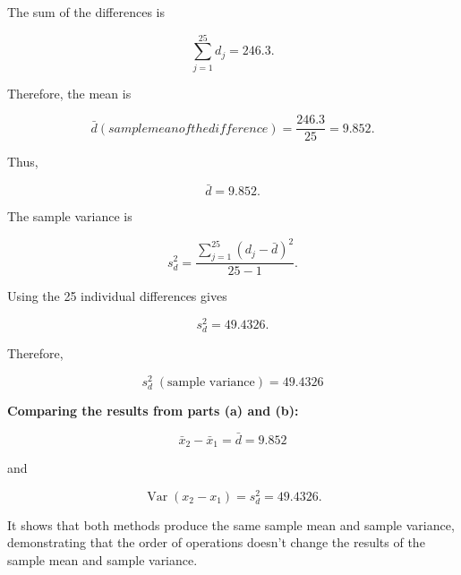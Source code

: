 \documentclass{article}
\begin{document}
The sum of the differences is

$$
\sum_{j=1}^{25}d_j=246.3.
$$

Therefore, the mean is

$$
\bar{d} (sample mean of the difference)
=
\frac{246.3}{25}
=
9.852.
$$

Thus,

$$
\boxed{\bar{d}=9.852}.
$$

The sample variance is

$$
s_d^2
=
\frac{\sum_{j=1}^{25}(d_j-\bar{d})^2}{25-1}.
$$

Using the 25 individual differences gives

$$
s_d^2=49.4326.
$$

Therefore,

$$
\boxed{
s_d^2\;(\text{sample variance})=49.4326
}
$$

\vspace{0.3cm}

\noindent
\textbf{Comparing the results from parts (a) and (b):}

$$
\boxed{
\bar{x}_2-\bar{x}_1
=
\bar{d}
=
9.852}
$$

and

$$
\boxed{
\operatorname{Var}(x_2-x_1)
=
s_d^2
=
49.4326}.
$$

It shows that both methods produce the same sample mean and sample variance, demonstrating that the order of operations doesn't change the results of the sample mean and sample variance.

\end{document}
